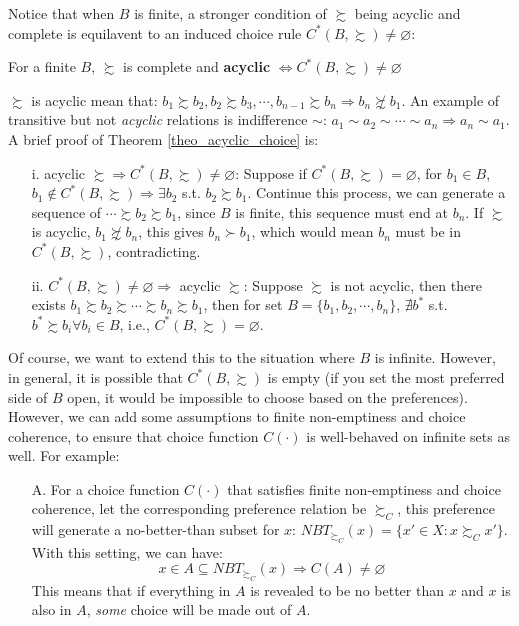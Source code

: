 Notice that when $B$ is finite, a stronger condition of $\succsim$ being acyclic and complete is equilavent to an induced choice rule $C^*(B,\succsim)\neq \varnothing$: 
\begin{theorem}\label{theo_acyclic_choice}
    For a finite $B$, $\succsim$ is complete and \textbf{acyclic} $\Leftrightarrow C^*(B,\succsim)\neq \varnothing$
\end{theorem}
$\succsim$ is acyclic mean that: $b_1\succsim b_2,b_2\succsim b_3,\cdots, b_{n-1}\succsim b_n\Rightarrow b_n\not\succsim b_1$. An example of transitive but not \textit{acyclic} relations is indifference $\sim$: $a_1\sim a_2\sim \cdots\sim a_n\Rightarrow a_n\sim a_1$.
A brief proof of Theorem \ref{theo_acyclic_choice} is:
\begin{enumerate}
    \item[i.] acyclic $\succsim\Rightarrow C^*(B,\succsim)\neq\varnothing$: Suppose if $C^*(B,\succsim)=\varnothing$, for $b_1\in B$, $b_1\notin C^*(B,\succsim)\Rightarrow \exists b_2$ s.t. $b_2\succsim b_1$. Continue this process, we can generate a sequence of $\cdots\succsim b_2\succsim b_1$, since $B$ is finite, this sequence must end at $b_n$. If $\succsim$ is acyclic, $b_1\not\succsim b_n$, this gives $b_n\succ b_1$, which would mean $b_n$ must be in $C^*(B,\succsim)$, contradicting.
    \item[ii.] $C^*(B,\succsim)\neq\varnothing\Rightarrow$ acyclic $\succsim$: Suppose $\succsim$ is not acyclic, then there exists $b_1\succsim b_2\succsim \cdots\succsim b_n\succsim b_1$, then for set $B=\{b_1,b_2,\cdots,b_n\}$, $\nexists b^*$ s.t. $b^*\succsim b_i \forall b_i\in B$, i.e., $C^*(B,\succsim)=\varnothing$.
\end{enumerate}

Of course, we want to extend this to the situation where $B$ is infinite. However, in general, it is possible that $C^*(B,\succsim)$ is empty (if you set the most preferred side of $B$ open, it would be impossible to choose based on the preferences). However, we can add some assumptions to finite non-emptiness and choice coherence, to ensure that choice function $C(\cdot)$ is well-behaved on infinite sets as well. For example:
\begin{enumerate}
    \item[A.] For a choice function $C(\cdot)$ that satisfies finite non-emptiness and choice coherence, let the corresponding preference relation be $\succsim_C$, this preference will generate a no-better-than subset for $x$: $NBT_{\succsim_C}(x)=\{x'\in X:x \succsim_C x'\}$. With this setting, we can have:
    $$x \in A \subseteq NBT_{\succsim_C}(x)\Rightarrow C(A)\neq \varnothing$$
    This means that if everything in $A$ is revealed to be no better than $x$ and $x$ is also in $A$, \textit{some} choice will be made out of $A$.
\end{enumerate}

